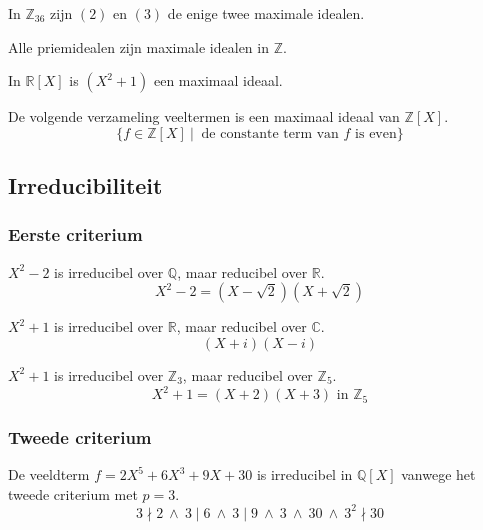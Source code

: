 \documentclass[main.tex]{subfiles}
\begin{document}
\begin{vb}
  In $\mathbb{Z}_{36}$ zijn $(2)$ en $(3)$ de enige twee maximale idealen.
\end{vb}

\begin{vb}
  Alle priemidealen zijn maximale idealen in $\mathbb{Z}$.
\end{vb}

\begin{vb}
  In $\mathbb{R}[X]$ is $(X^{2}+1)$ een maximaal ideaal.
\end{vb}

\begin{vb}
  De volgende verzameling veeltermen is een maximaal ideaal van $\mathbb{Z}[X]$.
  \[ \{ f \in \mathbb{Z}[X] \ |\ \text{ de constante term van } f \text{ is even} \} \]
\end{vb}

\subsection{Irreducibiliteit}
\label{sec:irreducibiliteit}

\subsubsection{Eerste criterium}
\label{sec:eerste-criterium}

\begin{vb}
  $X^{2}-2$ is irreducibel over $\mathbb{Q}$, maar reducibel over $\mathbb{R}$.
  \[ X^{2}-2 = (X-\sqrt{2})(X+\sqrt{2}) \]
\end{vb}

\begin{vb}
  $X^{2}+1$ is irreducibel over $\mathbb{R}$, maar reducibel over $\mathbb{C}$.
  \[ (X+i)(X-i) \]
\end{vb}

\begin{vb}
  $X^{2}+1$ is irreducibel over $\mathbb{Z}_{3}$, maar reducibel over $\mathbb{Z}_{5}$.
  \[ X^{2}+1 = (X+2)(X+3) \text{ in } \mathbb{Z}_{5} \]
\end{vb}

\subsubsection{Tweede criterium}
\label{sec:tweede-criterium}

\begin{vb}
  De veeldterm $f=2X^{5}+6X^{3}+9X+30$ is irreducibel in $\mathbb{Q}[X]$ vanwege het tweede criterium met $p=3$.
  \[ 3 \nmid 2\ \wedge\ 3 \mid 6\ \wedge\ 3 \mid 9\ \wedge\ 3\ \wedge\ 30\ \wedge\ 3^{2} \nmid 30 \]
\end{vb}
\end{document}
